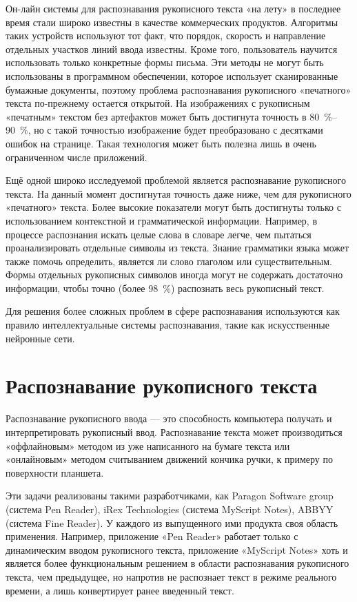 Он-лайн системы для распознавания рукописного текста «на лету» в последнее время стали широко известны в качестве коммерческих продуктов. Алгоритмы таких устройств используют тот факт, что порядок, скорость и направление отдельных участков линий ввода известны. Кроме того, пользователь научится использовать только конкретные формы письма. Эти методы не могут быть использованы в программном обеспечении, которое использует сканированные бумажные документы, поэтому проблема распознавания рукописного «печатного» текста по-прежнему остается открытой. На изображениях с рукописным «печатным» текстом без артефактов может быть достигнута точность в 80~\%--90~\%, но с такой точностью изображение будет преобразовано с десятками ошибок на странице. Такая технология может быть полезна лишь в очень ограниченном числе приложений.

Ещё одной широко исследуемой проблемой является распознавание рукописного текста. На данный момент достигнутая точность даже ниже, чем для рукописного «печатного» текста. Более высокие показатели могут быть достигнуты только с использованием контекстной и грамматической информации. Например, в процессе распознания искать целые слова в словаре легче, чем пытаться проанализировать отдельные символы из текста. Знание грамматики языка может также помочь определить, является ли слово глаголом или существительным. Формы отдельных рукописных символов иногда могут не содержать достаточно информации, чтобы точно (более 98~\%) распознать весь рукописный текст.

Для решения более сложных проблем в сфере распознавания используются как правило интеллектуальные системы распознавания, такие как искусственные нейронные сети.

\section{Распознавание рукописного текста}

Распознавание рукописного ввода --- это способность компьютера получать и интерпретировать рукописный ввод. Распознавание текста может производиться «оффлайновым» методом из уже написанного на бумаге текста или «онлайновым» методом считыванием движений кончика ручки, к примеру по поверхности планшета.

Эти задачи реализованы такими разработчиками, как Paragon Software group
(система Pen Reader), iRex Technologies (система MyScript Notes), ABBYY (система
Fine Reader). У каждого из выпущенного ими продукта своя область применения.
Например, приложение «Pen Reader» работает только с динамическим вводом
рукописного текста, приложение «MyScript Notes» хоть и является более
функциональным решением в области распознавания рукописного текста, чем
предыдущее, но напротив не распознает текст в режиме реального времени, а лишь
конвертирует ранее введенный текст.

